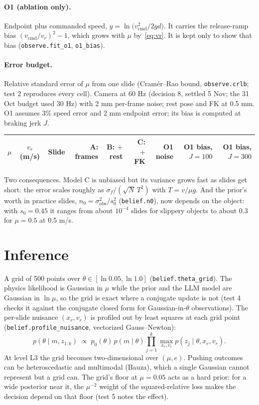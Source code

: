 \documentclass[10pt]{article}
\newcommand{\code}[1]{\texttt{#1}}
\begin{document}
\paragraph{O1 (ablation only).}  Endpoint plus commanded speed, $y=\ln\big(v_{\text{cmd}}^2/2gd\big)$.  It carries the
release-ramp bias $(v_{\text{cmd}}/v_r)^2-1$, which grows with $\mu$ by~\eqref{eq:vr}.  It is kept only to show that
bias (\code{observe.fit\_o1}, \code{o1\_bias}).

\paragraph{Error budget.}  Relative standard error of $\mu$ from one slide (Cram\'er--Rao bound,
\code{observe.crlb}; test 2 reproduces every cell).  Camera at 60 Hz (decision 8, settled 5 Nov; the 31 Oct budget used 30 Hz) with 2 mm per-frame noise; rest pose and FK
at 0.5 mm.  O1 assumes 3\% speed error and 2 mm endpoint error; its bias is computed at braking jerk $J$.
\begin{center}\small
\begin{tabular}{@{}cclrrrrrr@{}}
\toprule
$\mu$ & $v_r$ (m/s) & Slide & A: frames & B: $+$rest & C: $+$FK & O1 noise & O1 bias, $J{=}100$ & O1 bias, $J{=}300$\\
\midrule

\bottomrule
\end{tabular}
\end{center}
Two consequences.  Model C is unbiased but its variance grows fast as slides get short: the error scales roughly
as $\sigma_f/(\sqrt N\,T^{2})$ with $T=v/\mu g$.  And the prior's worth in practice slides,
$n_0=\sigma_{\text{obs}}^{2}/s_0^{2}$ (\code{belief.n0}), now depends on the object: with $s_0=0.45$ it ranges from
about $10^{-4}$ slides for slippery objects to about 0.3 for $\mu=0.5$ at 0.5 m/s.

\section{Inference}
\label{sec:inference}
A grid of 500 points over $\theta\in[\ln0.05,\ln1.0]$ (\code{belief.theta\_grid}).  The physics likelihood is
Gaussian in $\mu$ while the prior and the LLM model are Gaussian in $\ln\mu$, so the grid is exact where a conjugate
update is not (test 4 checks it against the conjugate closed form for Gaussian-in-$\theta$ observations).  The
per-slide nuisance $(x_r,v_r)$ is profiled out by least squares at each grid point
(\code{belief.profile\_nuisance}, vectorized Gauss--Newton):
\begin{equation}
p(\theta\mid m,z_{1:k})\;\propto\;p_0(\theta)\,p(m\mid\theta)\prod_{j=1}^{k}\max_{x_r,v_r}p(z_j\mid\theta,x_r,v_r).
\end{equation}
At level L3 the grid becomes two-dimensional over $(\mu,e)$.  Pushing outcomes can be heteroscedastic and
multimodal (Bauza), which a single Gaussian cannot represent but a grid can.  The grid's floor at $\mu=0.05$ acts as a
hard prior: for a wide posterior near it, the $\mu^{-2}$ weight of the squared-relative loss makes the decision
depend on that floor (test 5 notes the effect).
\end{document}
